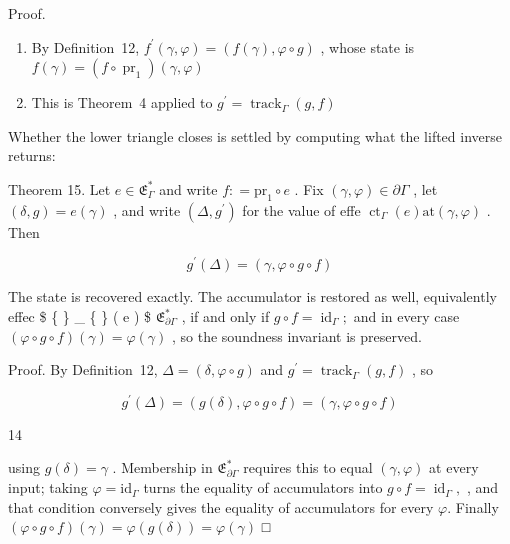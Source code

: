 \documentclass[
  10
]{article}
\begin{document}
Proof.

\begin{enumerate}
\def\labelenumi{\arabic{enumi}.}
\item
  By Definition~12,
  \(f ^ { \prime } ( \gamma , \varphi ) = ( f ( \gamma ) , \varphi \circ g )\)
  , whose state is
  \(f ( \gamma ) = ( f \circ \operatorname { p r } _ { 1 } ) ( \gamma , \varphi )\)
\item
  This is Theorem~4 applied to
  \(g ^ { \prime } = \operatorname { t r a c k } _ { \Gamma } ( g , f )\)
\end{enumerate}

Whether the lower triangle closes is settled by computing what the
lifted inverse returns:

Theorem 15. Let \(e \in \mathfrak { E } _ { \Gamma } ^ { * }\) and write
\(f : = \mathrm { p r } _ { 1 } \circ e\) . Fix
\(( \gamma , \varphi ) \in \partial \Gamma\) , let
\(( \delta , g ) = e ( \gamma )\) , and write
\(( \Delta , g ^ { \prime } )\) for the value of effe
\(\operatorname { c t } _ { \Gamma } ( e ) \mathrm { a t } \left( \gamma , \varphi \right)\)
. Then

\[
g ^ { \prime } ( \Delta ) = ( \gamma , \varphi \circ g \circ f )\tag{16}
\]

The state is recovered exactly. The accumulator is restored as well,
equivalently effec \$ \{  \} \_ \{ \Gamma \} ( e ) \in\$
\({ \mathfrak { E } } _ { \partial \Gamma } ^ { * }\) , if and only if
\(g \circ f = \operatorname { i d } _ { \Gamma } ;\) and in every case
\(( \varphi \circ g \circ f ) ( \gamma ) = \varphi ( \gamma )\) , so the
soundness invariant is preserved.

Proof. By Definition~12, \(\Delta = ( \delta , \varphi \circ g )\) and
\(g ^ { \prime } = \operatorname { t r a c k } _ { \Gamma } ( g , f )\)
, so

\[
g ^ { \prime } ( \Delta ) = ( g ( \delta ) , \varphi \circ g \circ f ) = ( \gamma , \varphi \circ g \circ f )
\]

14

using \(g ( \delta ) = \gamma\) . Membership in
\({ \mathfrak { E } } _ { \partial \Gamma } ^ { * }\) requires this to
equal \(( \gamma , \varphi )\) at every input; taking
\(\varphi = \mathrm { i d } _ { \Gamma }\) turns the equality of
accumulators into \(g \circ f = \operatorname { i d } _ { \Gamma } ,\) ,
and that condition conversely gives the equality of accumulators for
every \(\varphi .\) Finally
\(( \varphi \circ g \circ f ) ( \gamma ) = \varphi ( g ( \delta ) ) = \varphi ( \gamma )\)
□
\end{document}
